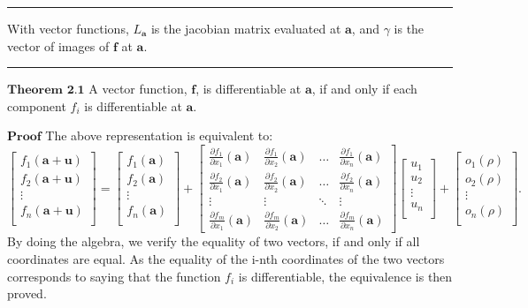 \documentclass[0pt, a4paper]{article}
\begin{document}
\noindent\rule{\textwidth}{1pt}

With vector functions, $L_\textbf{a}$ is the jacobian matrix evaluated at $\textbf{a}$, and $\gamma$ is the vector of images of $\textbf{f}$ at $\textbf{a}$.

\noindent\rule{\textwidth}{1pt}

$\textbf{Theorem 2.1}$ A vector function, $\textbf{f}$, is differentiable at $\textbf{a}$, if and only if each component $f_i$ is differentiable at $\textbf{a}$.

$\textbf{Proof}$ The above representation is equivalent to:
$$
\begin{bmatrix}
f_1(\textbf{a}+\textbf{u})\\ 
f_2(\textbf{a}+\textbf{u})\\
\vdots \\
f_n(\textbf{a}+\textbf{u})\\
\end{bmatrix}
=
\begin{bmatrix}
f_1(\textbf{a})\\ 
f_2(\textbf{a})\\
\vdots \\
f_n(\textbf{a})\\
\end{bmatrix}
+
\begin{bmatrix}
\frac{\partial f_1}{\partial x_1}(\textbf{a}) & \frac{\partial f_1}{\partial x_2}(\textbf{a}) & \dots & \frac{\partial f_1}{\partial x_n}(\textbf{a})\\ 
\frac{\partial f_2}{\partial x_1}(\textbf{a}) & \frac{\partial f_2}{\partial x_2}(\textbf{a}) & \dots & \frac{\partial f_2}{\partial x_n}(\textbf{a}) \\ 
\vdots & \vdots & \ddots & \vdots \\ 
\frac{\partial f_m}{\partial x_1}(\textbf{a}) & \frac{\partial f_m}{\partial x_2}(\textbf{a}) & \dots & \frac{\partial f_m}{\partial x_n}(\textbf{a})
\end{bmatrix}
\begin{bmatrix}
u_1\\ 
u_2\\
\vdots \\
u_n\\
\end{bmatrix}
+
\begin{bmatrix}
o_1(\rho)\\ 
o_2(\rho)\\
\vdots \\
o_n(\rho)\\
\end{bmatrix}.
$$
By doing the algebra, we verify the equality of two vectors, if and only if all coordinates are equal. As the equality of the i-nth coordinates of the two vectors corresponds to saying that the function $ f_i $ is differentiable, the equivalence is then proved.
\end{document}
